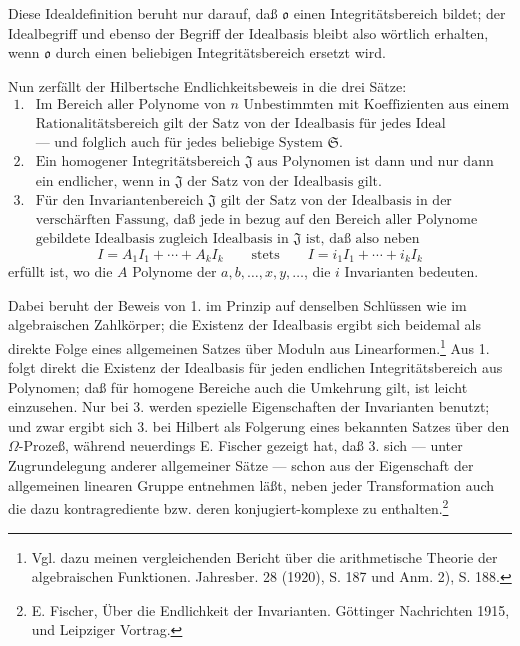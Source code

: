 \documentclass[11pt]{article}
\providecommand{\mJ}{\mathfrak J}
\providecommand{\mS}{\mathfrak S}
\providecommand{\mo}{\mathfrak o}
\begin{document}
Diese Idealdefinition beruht nur darauf, daß $\mo$ einen Integritätsbereich bildet; der Idealbegriff und ebenso der Begriff der Idealbasis bleibt also wörtlich erhalten, wenn $\mo$ durch einen beliebigen Integritätsbereich ersetzt wird.

Nun zerfällt der Hilbertsche Endlichkeitsbeweis in die drei Sätze:
\[
\begin{array}{ll}
1.& \text{Im Bereich aller Polynome von }n\text{ Unbestimmten mit Koeffizienten aus einem}\\
& \text{Rationalitätsbereich gilt der Satz von der Idealbasis für jedes Ideal}\\
& \text{--- und folglich auch für jedes beliebige System }\mS.\\[2pt]
2.& \text{Ein homogener Integritätsbereich }\mJ\text{ aus Polynomen ist dann und nur dann}\\
& \text{ein endlicher, wenn in }\mJ\text{ der Satz von der Idealbasis gilt.}\\[2pt]
3.& \text{Für den Invariantenbereich }\mJ\text{ gilt der Satz von der Idealbasis in der}\\
& \text{verschärften Fassung, daß jede in bezug auf den Bereich aller Polynome}\\
& \text{gebildete Idealbasis zugleich Idealbasis in }\mJ\text{ ist, daß also neben}
\end{array}
\]
\[
 I=A_1I_1+\cdots+A_kI_k
 \qquad\text{stets}\qquad
 I=i_1I_1+\cdots+i_kI_k
\]
erfüllt ist, wo die $A$ Polynome der $a,b,\ldots,x,y,\ldots$, die $i$ Invarianten bedeuten.

Dabei beruht der Beweis von 1. im Prinzip auf denselben Schlüssen wie im algebraischen Zahlkörper; die Existenz der Idealbasis ergibt sich beidemal als direkte Folge eines allgemeinen Satzes über Moduln aus Linearformen.\footnote{Vgl. dazu meinen vergleichenden Bericht über die arithmetische Theorie der algebraischen Funktionen. Jahresber. 28 (1920), S. 187 und Anm. 2), S. 188.} Aus 1. folgt direkt die Existenz der Idealbasis für jeden endlichen Integritätsbereich aus Polynomen; daß für homogene Bereiche auch die Umkehrung gilt, ist leicht einzusehen. Nur bei 3. werden spezielle Eigenschaften der Invarianten benutzt; und zwar ergibt sich 3. bei Hilbert als Folgerung eines bekannten Satzes über den $\Omega$-Prozeß, während neuerdings E. Fischer gezeigt hat, daß 3. sich --- unter Zugrundelegung anderer allgemeiner Sätze --- schon aus der Eigenschaft der allgemeinen linearen Gruppe entnehmen läßt, neben jeder Transformation auch die dazu kontragrediente bzw. deren konjugiert-komplexe zu enthalten.\footnote{E. Fischer, Über die Endlichkeit der Invarianten. Göttinger Nachrichten 1915, und Leipziger Vortrag.}
\end{document}
